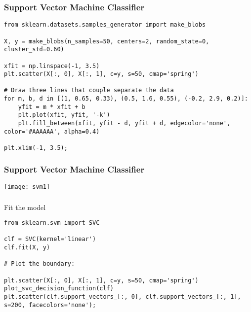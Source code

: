 \begin{frame}[fragile]\frametitle{Support Vector Machine Classifier}
\begin{lstlisting}
from sklearn.datasets.samples_generator import make_blobs

X, y = make_blobs(n_samples=50, centers=2, random_state=0, cluster_std=0.60)

xfit = np.linspace(-1, 3.5)
plt.scatter(X[:, 0], X[:, 1], c=y, s=50, cmap='spring')

# Draw three lines that couple separate the data
for m, b, d in [(1, 0.65, 0.33), (0.5, 1.6, 0.55), (-0.2, 2.9, 0.2)]:
    yfit = m * xfit + b
    plt.plot(xfit, yfit, '-k')
    plt.fill_between(xfit, yfit - d, yfit + d, edgecolor='none', color='#AAAAAA', alpha=0.4)

plt.xlim(-1, 3.5);
\end{lstlisting}
\end{frame}

\begin{frame}[fragile]\frametitle{Support Vector Machine Classifier}
\begin{center}
\texttt{[image: svm1]}
\end{center}
\end{frame}

\begin{frame}[fragile]\frametitle{}
Fit the model
\begin{lstlisting}
from sklearn.svm import SVC

clf = SVC(kernel='linear')
clf.fit(X, y)

# Plot the boundary:

plt.scatter(X[:, 0], X[:, 1], c=y, s=50, cmap='spring')
plot_svc_decision_function(clf)
plt.scatter(clf.support_vectors_[:, 0], clf.support_vectors_[:, 1], s=200, facecolors='none');
\end{lstlisting}
\end{frame}

